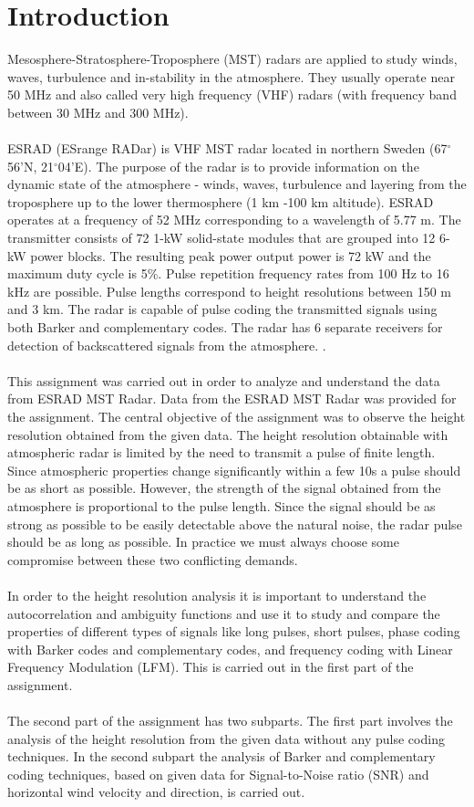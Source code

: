 \documentclass{article}
\begin{document}
\section{Introduction}
Mesosphere-Stratosphere-Troposphere (MST) radars are applied to study winds, waves, turbulence and in-stability in the atmosphere. They usually operate near 50 MHz and also called very high frequency (VHF) radars (with frequency band between 30 MHz and 300 MHz).\\
\\
ESRAD (ESrange RADar) is VHF MST radar located in northern Sweden (67$^{\circ}$56'N, 21$^{\circ}$04'E). The purpose of the radar is to provide information on the dynamic state of the atmosphere - winds, waves, turbulence and layering from the troposphere up to the lower thermosphere (1 km -100 km altitude). ESRAD operates at a frequency of 52 MHz corresponding to a wavelength of 5.77 m. The transmitter consists of 72 1-kW solid-state modules that are grouped into 12 6-kW power blocks. The resulting peak power output power is 72 kW and the maximum duty cycle is 5\%. Pulse repetition frequency rates from 100 Hz to 16 kHz are possible. Pulse lengths correspond to height resolutions between 150 m and 3 km. The radar is capable of pulse coding the transmitted signals using both Barker and complementary codes. The radar has 6 separate receivers for detection of backscattered signals from the atmosphere. \cite{Enmark:2012a2}.\\
\\
This assignment was carried out in order to analyze and understand the data from ESRAD MST Radar. Data from the ESRAD MST Radar was provided for the assignment. The central objective of the assignment was to observe the height resolution obtained from the given data. The height resolution obtainable with atmospheric radar is limited by the need to transmit a pulse of finite length. Since atmospheric properties change significantly within a few 10s a pulse should be as short as possible. However, the strength of the signal obtained from the atmosphere is proportional to the pulse length. Since the signal should be as strong as possible to be easily detectable above the natural noise, the radar pulse should be as long as possible. In practice we must always choose some compromise between these two conflicting demands.\\
\\
In order to the height resolution analysis it is important to understand the autocorrelation and ambiguity functions and use it to study and compare the properties of different types of signals like long pulses, short pulses, phase coding with Barker codes and complementary codes, and frequency coding with Linear Frequency Modulation (LFM). This is carried out in the first part of the assignment.\\
\\
The second part of the assignment has two subparts. The first part involves the analysis of the height resolution from the given data without any pulse coding techniques. In the second subpart the analysis of Barker and complementary coding techniques, based on given data for Signal-to-Noise ratio (SNR) and horizontal wind velocity and direction, is carried out. 
 
\end{document}
